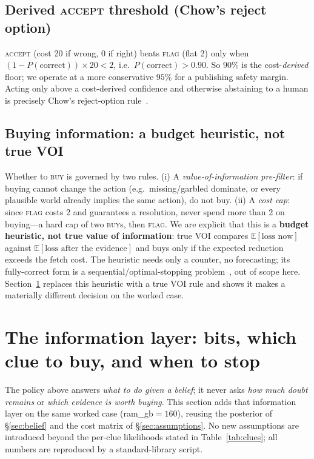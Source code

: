 \documentclass[11pt]{article}
\newcommand{\pcorrect}{P(\text{correct})}
\begin{document}
\subsection{Derived \textsc{accept} threshold (Chow's reject option)}
\textsc{accept} (cost 20 if wrong, 0 if right) beats \textsc{flag} (flat 2) only when
$(1-\pcorrect)\times 20 < 2$, i.e.\ $\pcorrect > 0.90$. So $90\%$ is the
cost-\emph{derived} floor; we operate at a more conservative $95\%$ for a publishing
safety margin. Acting only above a cost-derived confidence and otherwise abstaining to
a human is precisely Chow's reject-option rule~\cite{chow1970}.

\subsection{Buying information: a budget heuristic, not true VOI}
Whether to \textsc{buy} is governed by two rules. (i) A \emph{value-of-information
pre-filter}: if buying cannot change the action (e.g.\ \textsf{missing}/\textsf{garbled}
dominate, or every plausible world already implies the same action), do not buy.
(ii) A \emph{cost cap}: since \textsc{flag} costs 2 and guarantees a resolution, never
spend more than 2 on buying---a hard cap of two \textsc{buy}s, then \textsc{flag}.
We are explicit that this is a \textbf{budget heuristic, not true value of
information}: true VOI compares $\mathbb{E}[\text{loss now}]$ against
$\mathbb{E}[\text{loss after the evidence}]$ and buys only if the expected reduction
exceeds the fetch cost. The heuristic needs only a counter, no forecasting; its
fully-correct form is a sequential/optimal-stopping problem~\cite{wald1945sprt}, out
of scope here. Section~\ref{sec:info} replaces this heuristic with a true VOI rule and
shows it makes a materially different decision on the worked case.

\section{The information layer: bits, which clue to buy, and when to stop}
\label{sec:info}

The policy above answers \emph{what to do given a belief}; it never asks \emph{how
much doubt remains} or \emph{which evidence is worth buying}. This section adds that
information layer on the same worked case (\textsf{ram\_gb}$=160$), reusing the
posterior of \S\ref{sec:belief} and the cost matrix of \S\ref{sec:assumptions}. No new
assumptions are introduced beyond the per-clue likelihoods stated in
Table~\ref{tab:clues}; all numbers are reproduced by a standard-library script.
\end{document}
